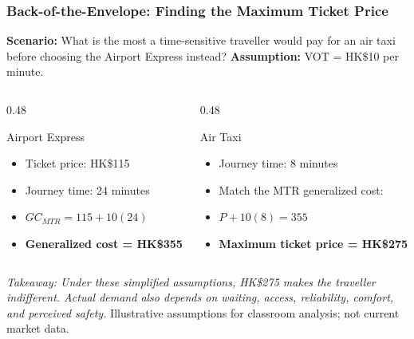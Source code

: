 \documentclass{beamer}
\begin{document}
\begin{frame}[t, shrink=10]
  \frametitle{Back-of-the-Envelope: Finding the Maximum Ticket Price}
  \textbf{Scenario:} What is the most a time-sensitive traveller would pay for an air taxi before choosing the Airport Express instead?
  \textbf{Assumption:} VOT = HK\$10 per minute.
  \begin{columns}[T]
    \begin{column}{0.48\textwidth}
      \begin{block}{Airport Express}
      \begin{itemize}
        \item Ticket price: HK\$115
        \item Journey time: 24 minutes
        \item \(GC_{MTR}=115+10(24)\)
        \item \textbf{Generalized cost = HK\$355}
      \end{itemize}
      \end{block}
    \end{column}
    \begin{column}{0.48\textwidth}
      \begin{block}{Air Taxi}
      \begin{itemize}
        \item Journey time: 8 minutes
        \item Match the MTR generalized cost:
        \item \(P+10(8)=355\)
        \item \textbf{Maximum ticket price = HK\$275}
      \end{itemize}
      \end{block}
    \end{column}
  \end{columns}
  \vspace{0.25cm}
  \textit{Takeaway: Under these simplified assumptions, HK\$275 makes the traveller indifferent. Actual demand also depends on waiting, access, reliability, comfort, and perceived safety.}
  \vfill
  {\tiny Illustrative assumptions for classroom analysis; not current market data.}
\end{frame}
\end{document}
